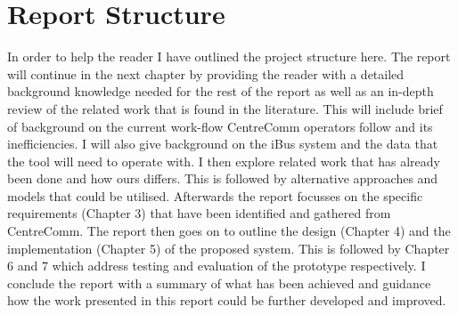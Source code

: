 \section{Report Structure}
In order to help the reader I have outlined the project structure here. The report will continue in the next chapter by providing the reader with a detailed background knowledge needed for the rest of the report as well as an in-depth review of the related work that is found in the literature. This will include brief of background on the current work-flow CentreComm operators follow and its inefficiencies. I will also give background on the iBus system and the data that the tool will need to operate with. I then explore related work that has already been done and how ours differs. This is followed by alternative approaches and models that could be utilised. Afterwards the report focusses on the specific requirements (Chapter 3) that have been identified and gathered from CentreComm. The report then goes on to outline the design (Chapter 4) and the implementation (Chapter 5) of the proposed system. This is followed by Chapter 6 and 7 which address testing and evaluation of the prototype respectively. I conclude the report with a summary of what has been achieved and guidance how the work presented in this report could be further developed and improved.